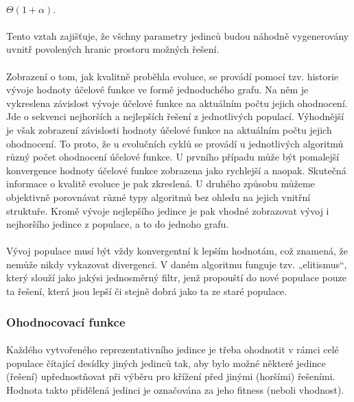 \documentclass[bc,male,java,dept460]{diploma}		%
\begin{document}
\paragraph*{}
$\Theta(1+\alpha)$.  

\paragraph*{}
Tento vztah zajišťuje, že všchny parametry jedinců budou náhodně vygenerovány uvnitř povolených hranic prostoru možných řešení.

\paragraph*{}
Zobrazení o tom, jak kvalitně proběhla evoluce, se provádí pomocí tzv. historie vývoje hodnoty účelové funkce ve formě jednoduchého grafu. Na něm je vykreslena závislost vývoje účelové funkce na aktuálním počtu jejich ohodnocení. Jde o sekvenci nejhorších a nejlepších řešení z jednotlivých populací. Výhodnější je však zobrazení závislosti hodnoty účelové funkce na aktuálním počtu jejich ohodnocení. To proto, že u evolučních cyklů se provádí u jednotlivých algoritmů různý počet ohodnocení účelové funkce. U prvního případu může být pomalejší konvergence hodnoty účelové funkce zobrazena jako rychlejší a naopak. Skutečná informace o kvalitě evoluce je pak zkreslená. U druhého způsobu můžeme objektivně porovnávat různé typy algoritmů bez ohledu na jejich vnitřní struktuře.
Kromě vývoje nejlepšího jedince je pak vhodné zobrazovat vývoj i nejhoršího jedince z populace, a to do jednoho grafu.

\paragraph*{}
Vývoj populace musí být vždy konvergentní k lepším hodnotám, což znamená, že nemůže nikdy vykazovat divergenci. V daném algoritmu funguje tzv. „elitismus“, který slouží jako jakýsi jednosměrný filtr, jenž propouští do nové populace pouze ta řešení, která jsou lepší či stejně dobrá jako ta ze staré populace.

\subsubsection{Ohodnocovací funkce}
\paragraph*{}
Každého vytvořeného reprezentativního jedince je třeba ohodnotit v rámci celé populace čítající desídky jiných jedinců tak, aby bylo možné některé jedince (řešení) upřednostňovat při výběru pro křížení před jinými (horšími) řešeními.
Hodnota takto přidělená jedinci je označována za jeho fitness (neboli vhodnost).
\end{document}
